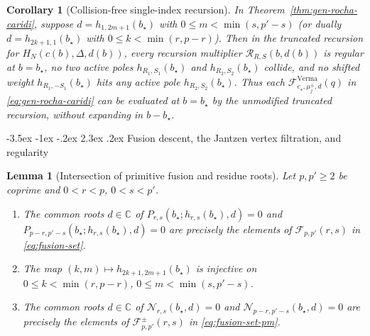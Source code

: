 \documentclass[twoside,10pt]{article}
\makeatletter
\numberwithin{equation}{section}
\theoremstyle{slbody}
\newtheorem{lemma}[theorem]{Lemma}
\newtheorem{corollary}[theorem]{Corollary}
\theoremstyle{definition}
\theoremstyle{remark}
\renewcommand{\section}{%
  \@startsection{section}{1}{\z@}%
    {-3.5ex \@plus -1ex \@minus -.2ex}%
    {2.3ex \@plus .2ex}%
    {\normalfont\large\bfseries}}
\makeatother
\begin{document}
\begin{corollary}[Collision-free single-index recursion]\label{cor:collision-free}
In Theorem~\ref{thm:gen-rocha-caridi}, suppose \(d=h_{1,2m+1}(b_\star)\) with
\(0\leq m<\min(s,p'-s)\) (or dually \(d=h_{2k+1,1}(b_\star)\) with
\(0\leq k<\min(r,p-r)\)).  Then in the truncated recursion for
\(H_N(c(b),\Delta,d(b))\), every recursion multiplier \(\mathcal{R}_{R,S}(b,d(b))\) is regular at
\(b=b_\star\), no two active poles \(h_{R_1,S_1}(b_\star)\) and
\(h_{R_2,S_2}(b_\star)\) collide, and no shifted weight
\(h_{R_1,-S_1}(b_\star)\) hits any active pole \(h_{R_2,S_2}(b_\star)\).  Thus
each \(\mathcal{F}^{\mathrm{Verma}}_{c_\star,\mu^\pm_j,d}(q)\) in
\eqref{eq:gen-rocha-caridi} can be evaluated at \(b=b_\star\) by the
unmodified truncated recursion, without expanding in \(b-b_\star\).
\end{corollary}

\section{Fusion descent, the Jantzen vertex filtration, and regularity}\label{sec:descent}

\begin{lemma}[Intersection of primitive fusion and residue roots]\label{lem:fusion-injective}
Let \(p,p'\geq2\) be coprime and \(0<r<p\), \(0<s<p'\).
\begin{enumerate}
 \item[(i)] The common roots \(d\in\mathbb{C}\) of
   \(P_{r,s}(b_\star;h_{r,s}(b_\star),d)=0\) and
   \(P_{p-r,p'-s}(b_\star;h_{r,s}(b_\star),d)=0\) are precisely the elements of
   \(\mathcal{F}_{p,p'}(r,s)\) in \eqref{eq:fusion-set}.
 \item[(ii)] The map \((k,m)\mapsto h_{2k+1,2m+1}(b_\star)\) is injective on
   \(0\leq k<\min(r,p-r)\), \(0\leq m<\min(s,p'-s)\).
 \item[(iii)] The common roots \(d\in\mathbb{C}\) of
   \(\mathcal{N}_{r,s}(b_\star,d)=0\) and \(\mathcal{N}_{p-r,p'-s}(b_\star,d)=0\) are
   precisely the elements of \(\mathcal{F}^\pm_{p,p'}(r,s)\) in
   \eqref{eq:fusion-set-pm}.
\end{enumerate}
\end{lemma}
\end{document}
